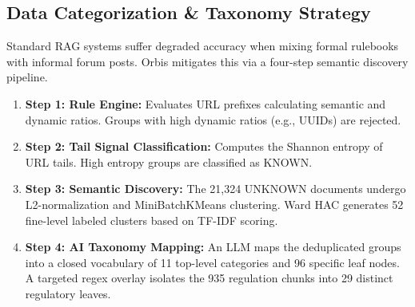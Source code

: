 \documentclass[a4paper,12pt]{article}
\begin{document}
\subsection{Data Categorization \& Taxonomy Strategy}
Standard RAG systems suffer degraded accuracy when mixing formal rulebooks with informal forum posts. Orbis mitigates this via a four-step semantic discovery pipeline.

\begin{enumerate}
    \item \textbf{Step 1: Rule Engine:} Evaluates URL prefixes calculating semantic and dynamic ratios. Groups with high dynamic ratios (e.g., UUIDs) are rejected.
    \item \textbf{Step 2: Tail Signal Classification:} Computes the Shannon entropy of URL tails. High entropy groups are classified as KNOWN.
    \item \textbf{Step 3: Semantic Discovery:} The 21,324 UNKNOWN documents undergo L2-normalization and MiniBatchKMeans clustering. Ward HAC generates 52 fine-level labeled clusters based on TF-IDF scoring.
    \item \textbf{Step 4: AI Taxonomy Mapping:} An LLM maps the deduplicated groups into a closed vocabulary of 11 top-level categories and 96 specific leaf nodes. A targeted regex overlay isolates the 935 regulation chunks into 29 distinct regulatory leaves.
\end{enumerate}
\end{document}
